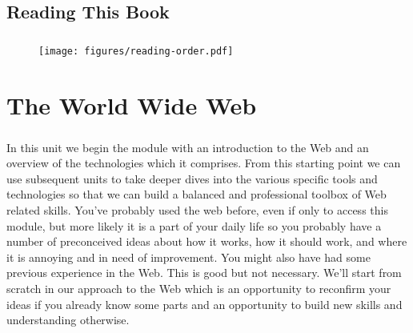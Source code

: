 \documentclass[12pt, a4paper, oneside]{book}
\begin{document}
\section{Reading This Book}
\label{readme}
\paragraph{} 

\begin{figure}[H]
\centering
\texttt{[image: figures/reading-order.pdf]}
\label{fig:reading-order}
\end{figure}















\chapter{The World Wide Web}
\label{www}
\paragraph{} In this unit we begin the module with an introduction to the Web and an overview of the technologies which it comprises. From this starting point we can use subsequent units to take deeper dives into the various specific tools and technologies so that we can build a balanced and professional toolbox of Web related skills. You've probably used the web before, even if only to access this module, but more likely it is a part of your daily life so you probably have a number of preconceived ideas about how it works, how it should work, and where it is annoying and in need of improvement. You might also have had some previous experience in the Web. This is good but not necessary. We'll start from scratch in our approach to the Web which is an opportunity to reconfirm your ideas if you already know some parts and an opportunity to build new skills and understanding otherwise. 
 
\end{document}
